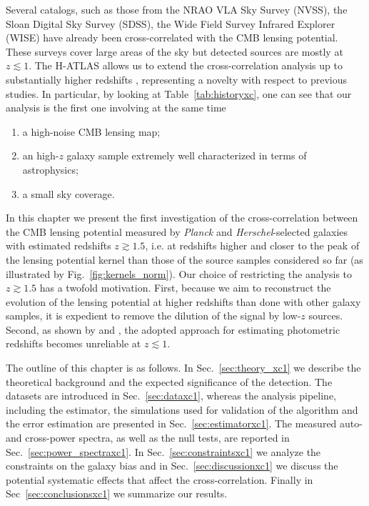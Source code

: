 Several catalogs, such as those from the NRAO VLA Sky Survey (NVSS),  the Sloan Digital Sky Survey (SDSS), 
the Wide Field Survey Infrared Explorer (WISE) have already been cross-correlated with the \gls{CMB} lensing potential. 
These surveys cover large areas of the sky but detected sources are mostly at $z\lesssim 1$. The H-ATLAS \citep{Eales2010a} allows us to extend the cross-correlation analysis up to 
substantially higher redshifts \citep{Lapi2011,Gonzalez-Nuevo2012}, representing a novelty with respect to previous studies. In particular, by looking at Table~\eqref{tab:historyxc}, one can see that our analysis is the first one involving at the same time
\begin{enumerate} 
\item{a high-noise \gls{CMB} lensing map;} 
\item{an high-$z$ galaxy sample extremely well characterized in terms of astrophysics;}  
\item{a small sky coverage.}
\end{enumerate}

In this chapter we present the first investigation of the cross-correlation between the \gls{CMB} lensing potential measured by \textit{Planck} and \textit{Herschel}-selected galaxies with estimated redshifts $z\gtrsim 1.5$, i.e. at redshifts higher and closer to the peak of the lensing potential kernel than those of  the source samples considered so far (as illustrated by Fig.~\eqref{fig:kernels_norm}). Our choice of restricting the analysis to $z\gtrsim 1.5$ has a twofold motivation. First, because we aim to reconstruct the evolution of the lensing potential at higher redshifts than done with other galaxy samples, it is expedient to remove the dilution of the signal by low-$z$ sources. Second, as shown by \cite{Lapi2011} and \cite{Gonzalez-Nuevo2012}, the adopted approach for estimating photometric redshifts becomes unreliable at $z \lesssim 1$.

The outline of this chapter is as follows. In Sec.~\eqref{sec:theory_xc1} we describe the theoretical background and the expected significance of the detection. The datasets are introduced in Sec.~\eqref{sec:dataxc1}, whereas the analysis pipeline, including the estimator, the simulations used for validation of the algorithm and the error estimation are presented in Sec.~\eqref{sec:estimatorxc1}. The measured auto- and cross-power spectra, as well as the null tests, are reported in Sec.~\eqref{sec:power_spectraxc1}. In Sec.~\eqref{sec:constraintsxc1}  we analyze the constraints on the galaxy bias and in Sec.~\eqref{sec:discussionxc1} we discuss the potential systematic effects that affect the cross-correlation. Finally in Sec~\eqref{sec:conclusionsxc1} we summarize our results.

